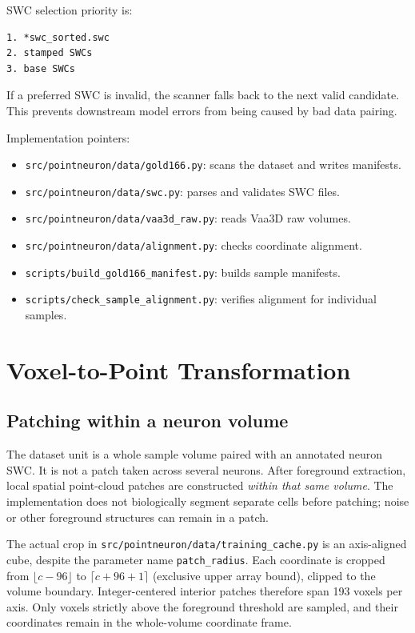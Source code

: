 \documentclass[11pt]{article}
\begin{document}
SWC selection priority is:

\begin{lstlisting}
1. *swc_sorted.swc
2. stamped SWCs
3. base SWCs
\end{lstlisting}

If a preferred SWC is invalid, the scanner falls back to the next valid
candidate. This prevents downstream model errors from being caused by bad data
pairing.

Implementation pointers:

\begin{itemize}
  \item \texttt{src/pointneuron/data/gold166.py}: scans the dataset and writes
  manifests.
  \item \texttt{src/pointneuron/data/swc.py}: parses and validates SWC files.
  \item \texttt{src/pointneuron/data/vaa3d\_raw.py}: reads Vaa3D raw volumes.
  \item \texttt{src/pointneuron/data/alignment.py}: checks coordinate
  alignment.
  \item \texttt{scripts/build\_gold166\_manifest.py}: builds sample manifests.
  \item \texttt{scripts/check\_sample\_alignment.py}: verifies alignment for
  individual samples.
\end{itemize}

\section{Voxel-to-Point Transformation}

\subsection{Patching within a neuron volume}

The dataset unit is a whole sample volume paired with an annotated neuron SWC.
It is not a patch taken across several neurons. After foreground extraction,
local spatial point-cloud patches are constructed \emph{within that same
volume}. The implementation does not biologically segment separate cells before
patching; noise or other foreground structures can remain in a patch.

The actual crop in
\texttt{src/pointneuron/data/training\_cache.py} is an axis-aligned cube, despite
the parameter name \texttt{patch\_radius}. Each coordinate is cropped from
$\lfloor c-96\rfloor$ to $\lceil c+96+1\rceil$ (exclusive upper array bound),
clipped to the volume boundary. Integer-centered interior patches therefore
span 193 voxels per axis. Only voxels strictly above the foreground threshold
are sampled, and their coordinates remain in the whole-volume coordinate frame.
\end{document}
